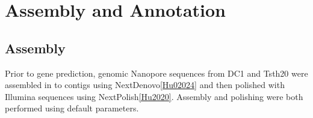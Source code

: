 \section{Assembly and Annotation}

\subsection{Assembly}

Prior to gene prediction, genomic Nanopore sequences from DC1 and
Tsth20 were assembled in to contigs using NextDenovo\ref{Hu02024} and
then polished with Illumina sequences using
NextPolish\ref{Hu2020}. Assembly and polishing were both performed
using default parameters.






